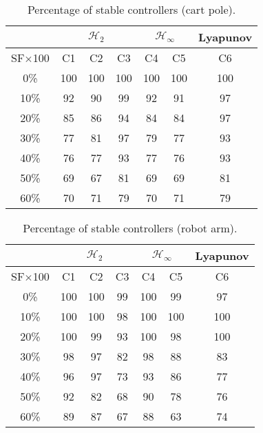 \begin{table}[H]
\centering
\scriptsize
\begin{tabular}{| c || c | c | c | c | c | c |}
	\hline
	 & \multicolumn{3}{c|}{$\mathcal{H}_{2}$} & \multicolumn{2}{c|}{$\mathcal{H}_{\infty}$} & Lyapunov\\
	\hline
	SF$\times$100 & C1& C2 & C3 & C4 & C5 & C6\\
	\hline\hline
	 0\% & 100 & 100 & 100 & 100 & 100 & 100 \\
	\hline
	10\% & 92 & 90 & 99 & 92 & 91 & 97\\
	\hline
	20\% & 85 & 86 & 94 & 84 & 84 & 97\\
	\hline
	30\% & 77 & 81 & 97 & 79 & 77 & 93\\
	\hline
	40\% & 76 & 77 & 93 & 77 & 76 & 93\\
	\hline
	50\% & 69 & 67 & 81 & 69 & 69 & 81\\
	\hline
	60\% & 70 & 71 & 79 & 70 & 71 & 79\\
	\hline
\end{tabular}
\caption{Percentage of stable controllers (cart pole).}
\label{table:percent_stable_cart_pole:unc}
\end{table}

\begin{table}[H]
\centering
\scriptsize
\begin{tabular}{| c || c | c | c | c | c | c |}
	\hline
	 & \multicolumn{3}{c|}{$\mathcal{H}_{2}$} & \multicolumn{2}{c|}{$\mathcal{H}_{\infty}$} & Lyapunov\\
	\hline
	SF$\times$100 & C1& C2 & C3 & C4 & C5 & C6\\
	\hline\hline
	 0\% & 100 & 100 & 99 & 100 & 99 & 97 \\
	\hline
	10\% & 100 & 100 & 98 & 100 & 100 & 100\\
	\hline
	20\% & 100 & 99 & 93 & 100 & 98 & 100\\
	\hline
	30\% & 98 & 97 & 82 & 98 & 88 & 83\\
	\hline
	40\% & 96 & 97 & 73 & 93 & 86 & 77\\
	\hline
	50\% & 92 & 82 & 68 & 90 & 78 & 76\\
	\hline
	60\% & 89 & 87 & 67 & 88 & 63 & 74\\
	\hline
\end{tabular}
\caption{Percentage of stable controllers (robot arm).}
\label{table:percent_stable_robot_arm:unc}
\end{table}

